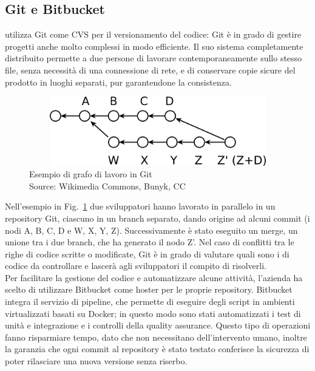    \subsection{Git e Bitbucket}
   \nomeAzienda{} utilizza Git come \gls{CVS} per il versionamento del codice: Git è in grado di gestire progetti anche molto complessi in modo efficiente. Il suo sistema completamente distribuito permette a due persone di lavorare contemporaneamente sullo stesso file, senza necessità di una connessione di rete, e di conservare copie sicure del prodotto in luoghi separati, pur garantendone la consistenza.
   \begin{figure}[H]
      \begin{center}
         \includegraphics[width=15cm,height=3cm,keepaspectratio]{immagini/git-branches}
      \end{center}
      \caption[Esempio di grafo di lavoro in Git]{Esempio di grafo di lavoro in Git
      \\
      Source: Wikimedia Commons, Bunyk, CC}\label{grafogit}
   \end{figure}
   Nell'esempio in Fig.~\ref{grafogit} due sviluppatori hanno lavorato in parallelo in un repository Git, ciascuno in un branch separato, dando origine ad alcuni commit (i nodi A, B, C, D e W, X, Y, Z). Successivamente è stato eseguito un merge, un unione tra i due branch, che ha generato il nodo Z'. Nel caso di conflitti tra le righe di codice scritte o modificate, Git è in grado di valutare quali sono i  di codice da controllare e lascerà agli sviluppatori il compito di risolverli.
   \\
   Per facilitare la gestione del codice e automatizzare alcune attività, l'azienda ha scelto di utilizzare Bitbucket come hoster per le proprie repository. Bitbucket integra il servizio di pipeline, che permette di eseguire degli script in ambienti virtualizzati basati su Docker; in questo modo sono stati automatizzati i test di unità e integrazione e i controlli della quality assurance. Questo tipo di operazioni fanno risparmiare tempo, dato che non necessitano dell'intervento umano, inoltre la garanzia che ogni commit al repository è stato testato conferisce la sicurezza di poter rilasciare una nuova versione senza riserbo.
